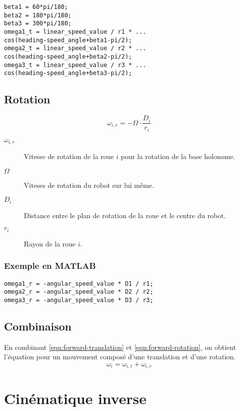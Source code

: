 \documentclass[a4paper]{paper}
\begin{document}
\begin{lstlisting}
beta1 = 60*pi/180;
beta2 = 180*pi/180;
beta3 = 300*pi/180;
omega1_t = linear_speed_value / r1 * ...
cos(heading-speed_angle+beta1-pi/2);
omega2_t = linear_speed_value / r2 * ...
cos(heading-speed_angle+beta2-pi/2);
omega3_t = linear_speed_value / r3 * ...
cos(heading-speed_angle+beta3-pi/2);
\end{lstlisting}

\subsection{Rotation}
\begin{equation}
    \omega_{i, r} = - \Omega \cdot \frac{D_i}{r_i}
    \label{eqn:forward-rotation}
\end{equation}

\begin{description}
    \item[$\omega_{i,r}$] Vitesse de rotation de la roue $i$ pour la rotation de la base holonome.
    \item[$\Omega$] Viteses de rotation du robot sur lui même.
    \item[$D_i$] Distance entre le plan de rotation de la roue et le centre du robot.
    \item[$r_i$] Rayon de la roue $i$.
\end{description}
\subsubsection{Exemple en MATLAB}
\begin{lstlisting}
omega1_r = -angular_speed_value * D1 / r1;
omega2_r = -angular_speed_value * D2 / r2;
omega3_r = -angular_speed_value * D3 / r3;
\end{lstlisting}

\subsection{Combinaison}
En combinant \eqref{eqn:forward-translation} et \eqref{eqn:forward-rotation}, on obtient l'équation
pour un mouvement composé d'une translation et d'une rotation.
\begin{equation}
    \omega_i = \omega_{i,t} + \omega_{i,r}
    \label{eqn-forward-complete}
\end{equation}
\section{Cinématique inverse}
\end{document}
